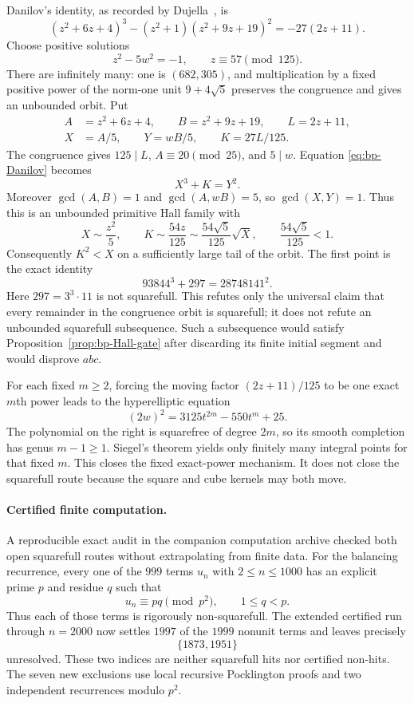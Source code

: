 Danilov's identity, as recorded by Dujella~\cite{Danilov1982,Dujella2011}, is
\begin{equation}\label{eq:bp-Danilov}
 (z^2+6z+4)^3-(z^2+1)(z^2+9z+19)^2=-27(2z+11).
\end{equation}
Choose positive solutions
\[
 z^2-5w^2=-1,\qquad z\equiv57\pmod{125}.
\]
There are infinitely many: one is $(682,305)$, and multiplication by a fixed
positive power of the norm-one unit $9+4\sqrt5$ preserves the congruence and
gives an unbounded orbit.  Put
\[
 \begin{split}
 A&=z^2+6z+4,\qquad B=z^2+9z+19,\qquad L=2z+11,\\
 X&=A/5,\qquad Y=wB/5,\qquad K=27L/125.
 \end{split}
\]
The congruence gives $125\mid L$, $A\equiv20\pmod{25}$, and $5\mid w$.
Equation \eqref{eq:bp-Danilov} becomes
\begin{equation}\label{eq:bp-Danilov-normalized}
                         X^3+K=Y^2.
\end{equation}
Moreover $\gcd(A,B)=1$ and $\gcd(A,wB)=5$, so $\gcd(X,Y)=1$.  Thus this is
an unbounded primitive Hall family with
\[
       X\sim\frac{z^2}{5},\qquad
       K\sim\frac{54z}{125}
        \sim\frac{54\sqrt5}{125}\sqrt X,\qquad
       \frac{54\sqrt5}{125}<1.
\]
Consequently $K^2<X$ on a sufficiently large tail of the orbit.
The first point is the exact identity
\[
                     93844^3+297=28748141^2.
\]
Here $297=3^3\cdot11$ is not squarefull.  This refutes only the universal
claim that every remainder in the congruence orbit is squarefull; it does not
refute an unbounded squarefull subsequence.  Such a subsequence would satisfy
Proposition~\ref{prop:bp-Hall-gate} after discarding its finite initial segment
and would disprove $abc$.

For each fixed $m\geq2$, forcing the moving factor
$(2z+11)/125$ to be one exact $m$th power leads to the hyperelliptic equation
\[
 (2w)^2=3125t^{2m}-550t^m+25.
\]
The polynomial on the right is squarefree of degree $2m$, so its smooth
completion has genus $m-1\geq1$.  Siegel's theorem yields only finitely many
integral points for that fixed $m$.  This closes the fixed exact-power
mechanism.  It does not close the squarefull route because the square and
cube kernels may both move.

\paragraph{Certified finite computation.}
A reproducible exact audit in the companion computation archive checked both
open squarefull routes without extrapolating from finite data.  For the
balancing recurrence, every one of the $999$ terms $u_n$ with
$2\leq n\leq1000$ has an explicit prime $p$ and residue $q$ such that
\[
                  u_n\equiv pq\pmod {p^2},\qquad 1\leq q<p.
\]
Thus each of those terms is rigorously non-squarefull.  The extended
certified run through $n=2000$ now settles $1997$ of the $1999$ nonunit terms
and leaves precisely
\[
                         \{1873,1951\}
\]
unresolved.  These two indices are neither squarefull hits nor certified
non-hits.  The seven new exclusions use local recursive Pocklington proofs and
two independent recurrences modulo $p^2$.

